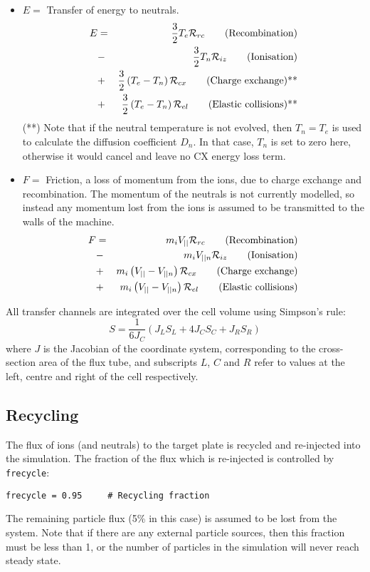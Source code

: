 \documentclass[12pt,a4paper]{article}
\begin{document}
\begin{itemize}
\item $E = $ Transfer of energy to neutrals.
  \begin{eqnarray*}
    E &=& \frac{3}{2} T_e \mathcal{R}_{rc} \qquad \mbox{\textrm{(Recombination)}} \\
    &-& \frac{3}{2} T_n \mathcal{R}_{iz}  \qquad \mbox{\textrm{(Ionisation)}} \\
    &+& \frac{3}{2}\left(T_e - T_n\right)\mathcal{R}_{cx} \qquad \mbox{\textrm{(Charge exchange)**}} \\
    &+& \frac{3}{2}\left(T_e - T_n\right)\mathcal{R}_{el} \qquad \mbox{\textrm{(Elastic collisions)**}}
  \end{eqnarray*}
  (**) Note that if the neutral temperature is not evolved, then $T_n = T_e$ is used to calculate
  the diffusion coefficient $D_n$. In that case, $T_n$ is set to zero here, otherwise it would
  cancel and leave no CX energy loss term.
\item $F = $ Friction, a loss of momentum from the ions, due to charge exchange and recombination. 
The momentum of the neutrals is not currently modelled, so instead any momentum lost from the ions 
is assumed to be transmitted to the walls of the machine. 
\begin{eqnarray*}
  F &=& m_iV_{||}\mathcal{R}_{rc} \qquad \mbox{\textrm{(Recombination)}} \\
  &-& m_iV_{||n}\mathcal{R}_{iz} \qquad \mbox{\textrm{(Ionisation)}} \\
  &+& m_i\left(V_{||} - V_{||n}\right)\mathcal{R}_{cx}  \qquad \mbox{\textrm{(Charge exchange)}} \\
  &+& m_i\left(V_{||} - V_{||n}\right)\mathcal{R}_{el}  \qquad \mbox{\textrm{(Elastic collisions)}}
\end{eqnarray*}
\end{itemize}


All transfer channels are integrated over the cell volume using Simpson's rule:
\[
S = \frac{1}{6J_C}\left( J_LS_L + 4J_CS_C + J_RS_R \right)
\]
where $J$ is the Jacobian of the coordinate system, corresponding to the
cross-section area of the flux tube, and subscripts $L$, $C$ and $R$ refer
to values at the left, centre and right of the cell respectively.

\subsection{Recycling}

The flux of ions (and neutrals) to the target plate is recycled and re-injected into the simulation. The
fraction of the flux which is re-injected is controlled by \texttt{frecycle}:
\begin{verbatim}
frecycle = 0.95     # Recycling fraction
\end{verbatim}
The remaining particle flux (5\% in this case) is assumed to be lost from the system. Note that
if there are any external particle sources, then this fraction must be less than 1, or the number
of particles in the simulation will never reach steady state.
\end{document}
